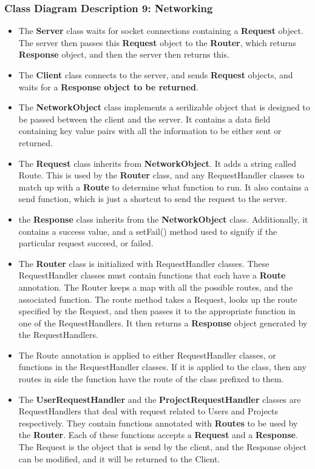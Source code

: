 \documentclass[twoside,letterpaper]{article}
\begin{document}
	\subsubsection{Class Diagram Description 9: Networking}
	\begin{itemize}
		\item The \textbf{Server} class waits for socket connections containing a \textbf{Request} object. The server then passes this \textbf{Request} object to the \textbf{Router}, which returns \textbf{Response} object, and then the server then returns this.
		\item The \textbf{Client} class connects to the server, and sends \textbf{Request} objects, and waits for a \textbf{Response object to be returned}.
		\item The \textbf{NetworkObject} class implements a serilizable object that is designed to be passed between the client and the server. It contains a data field containing key value pairs with all the information to be either sent or returned.
		\item The \textbf{Request} class inherits from \textbf{NetworkObject}. It adds a string called Route. This is used by the \textbf{Router} class, and any RequestHandler classes to match up with a \textbf{Route} to determine what function to run. It also contains a send function, which is just a shortcut to send the request to the server.
		\item the \textbf{Response} class inherits from the \textbf{NetworkObject} class. Additionally, it contains a success value, and a setFail() method used to signify if the particular request succeed, or failed.
		\item The \textbf{Router} class is initialized with RequestHandler classes. These RequestHandler classes must contain functions that each have a \textbf{Route} annotation. The Router keeps a map with all the possible routes, and the associated function. The route method takes a Request, looks up the route specified by the Request, and then passes it to the appropriate function in one of the RequestHandlers. It then returns a \textbf{Response} object generated by the RequestHandlers.
		\item The {Route} annotation is applied to either RequestHandler classes, or functions in the RequestHandler classes. If it is applied to the class, then any routes in side the function have the route of the class prefixed to them.
		\item The \textbf{UserRequestHandler} and the \textbf{ProjectRequestHandler} classes are RequestHandlers that deal with request related to Users and Projects respectively. They contain functions annotated with \textbf{Routes} to be used by the \textbf{Router}. Each of these functions accepts a \textbf{Request} and a \textbf{Response}. The Request is the object that is send by the client, and the Response object can be modified, and it will be returned to the Client.
	\end{itemize}
\end{document}
